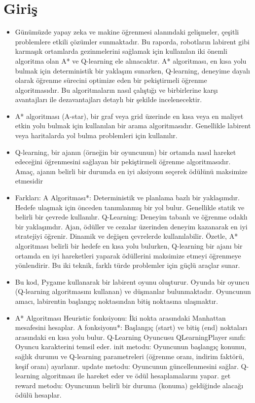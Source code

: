 \documentclass[12pt, a4paper]{article}
\begin{document}
	\section{Giriş}
	\begin{itemize}
		\item Günümüzde yapay zeka ve makine öğrenmesi alanındaki gelişmeler, çeşitli problemlere etkili çözümler sunmaktadır. Bu raporda, robotların labirent gibi karmaşık ortamlarda gezinmelerini sağlamak için kullanılan iki önemli algoritma olan A* ve Q-learning ele alınacaktır. A* algoritması, en kısa yolu bulmak için deterministik bir yaklaşım sunarken, Q-learning, deneyime dayalı olarak öğrenme sürecini optimize eden bir pekiştirmeli öğrenme algoritmasıdır. Bu algoritmaların nasıl çalıştığı ve birbirlerine karşı avantajları ile dezavantajları detaylı bir şekilde incelenecektir.
		
\item A* algoritması (A-star), bir graf veya grid üzerinde en kısa veya en maliyet etkin yolu bulmak için kullanılan bir arama algoritmasıdır. Genellikle labirent veya haritalarda yol bulma problemleri için kullanılır. 

\item Q-learning, bir ajanın (örneğin bir oyuncunun) bir ortamda nasıl hareket edeceğini öğrenmesini sağlayan bir pekiştirmeli öğrenme algoritmasıdır. Amaç, ajanın belirli bir durumda en iyi aksiyonu seçerek ödülünü maksimize etmesidir



\item  Farkları: A Algoritması*: Deterministik ve planlama bazlı bir yaklaşımdır. Hedefe ulaşmak için önceden tanımlanmış bir yol bulur. Genellikle statik ve belirli bir çevrede kullanılır.
Q-Learning: Deneyim tabanlı ve öğrenme odaklı bir yaklaşımdır. Ajan, ödüller ve cezalar üzerinden deneyim kazanarak en iyi stratejiyi öğrenir. Dinamik ve değişen çevrelerde kullanılabilir.
Özetle, A* algoritması belirli bir hedefe en kısa yolu bulurken, Q-learning bir ajanı bir ortamda en iyi hareketleri yaparak ödüllerini maksimize etmeyi öğrenmeye yönlendirir. Bu iki teknik, farklı türde problemler için güçlü araçlar sunar.

\item Bu kod, Pygame kullanarak bir labirent oyunu oluşturur. Oyunda bir oyuncu (Q-learning algoritmasını kullanan) ve düşmanlar bulunmaktadır. Oyuncunun amacı, labirentin başlangıç noktasından bitiş noktasına ulaşmaktır.

\item A* Algoritması Heuristic fonksiyonu: İki nokta arasındaki Manhattan mesafesini hesaplar.
A fonksiyonu*: Başlangıç (start) ve bitiş (end) noktaları arasındaki en kısa yolu bulur. Q-Learning Oyuncusu
QLearningPlayer sınıfı: Oyuncu karakterini temsil eder.
init metodu: Oyuncunun başlangıç konumu, sağlık durumu ve Q-learning parametreleri (öğrenme oranı, indirim faktörü, keşif oranı) ayarlanır.
update metodu: Oyuncunun güncellenmesini sağlar. Q-learning algoritması ile hareket eder ve ödül hesaplamalarını yapar.
get reward metodu: Oyuncunun belirli bir duruma (konuma) geldiğinde alacağı ödülü hesaplar.


\end{itemize}
\end{document}
